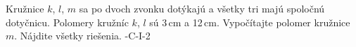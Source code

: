 
{Kružnice $k$, $l$, $m$ sa po dvoch zvonku dotýkajú a všetky tri majú spoločnú dotyčnicu. Polomery kružníc $k$, $l$ sú 3\,cm a 12\,cm. Vypočítajte polomer kružnice $m$. Nájdite všetky riešenia. 
}{
-C-I-2
}
